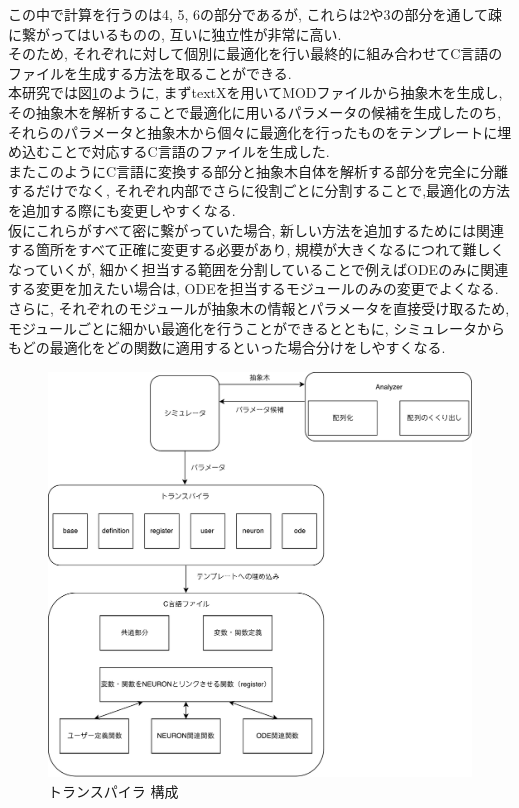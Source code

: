この中で計算を行うのは4, 5, 6の部分であるが, これらは2や3の部分を通して疎に繋がってはいるものの,
互いに独立性が非常に高い.\\
そのため, それぞれに対して個別に最適化を行い最終的に組み合わせてC言語のファイルを生成する方法を取ることができる.\\
本研究では図\ref{fig:transpiler}のように, まずtextXを用いてMODファイルから抽象木を生成し,
その抽象木を解析することで最適化に用いるパラメータの候補を生成したのち,
それらのパラメータと抽象木から個々に最適化を行ったものをテンプレートに埋め込むことで対応するC言語のファイルを生成した.\\

またこのようにC言語に変換する部分と抽象木自体を解析する部分を完全に分離するだけでなく,
それぞれ内部でさらに役割ごとに分割することで,最適化の方法を追加する際にも変更しやすくなる.\\
仮にこれらがすべて密に繋がっていた場合, 新しい方法を追加するためには関連する箇所をすべて正確に変更する必要があり,
規模が大きくなるにつれて難しくなっていくが, 細かく担当する範囲を分割していることで例えばODEのみに関連する変更を加えたい場合は,
ODEを担当するモジュールのみの変更でよくなる.\\
さらに, それぞれのモジュールが抽象木の情報とパラメータを直接受け取るため, モジュールごとに細かい最適化を行うことができるとともに,
シミュレータからもどの最適化をどの関数に適用するといった場合分けをしやすくなる.\\

\begin{figure}[htb]
  \begin{center}
    \includegraphics[width=1.1\textwidth]{./images/transpiler-image.pdf}
    \caption{トランスパイラ 構成}
    \label{fig:transpiler}
  \end{center}
\end{figure}~\\

